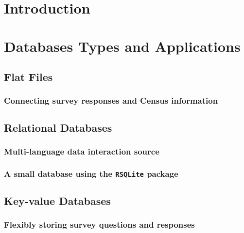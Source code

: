 \documentclass[]{article}
\begin{document}
\maketitle


\section{Introduction}

\section{Databases Types and Applications}

\subsection{Flat Files}

\subsubsection{Connecting survey responses and Census information}

\subsection{Relational Databases}

\subsubsection{Multi-language data interaction source}

\citep{Fredrickson:2010fk}

\subsubsection{A small database using the \texttt{RSQLite} package}

\subsection{Key-value Databases}

\subsubsection{Flexibly storing survey questions and responses}
\end{document}
